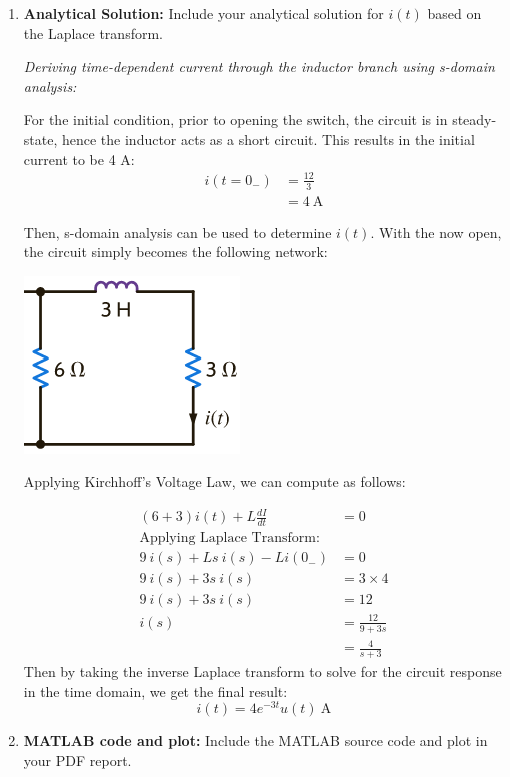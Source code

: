 \documentclass[10pt, letterpaper]{article}
\begin{document}
\begin{enumerate}
\item \textbf{Analytical Solution: }Include your analytical solution for $i(t)$ based on the Laplace transform.

\textit{Deriving time-dependent current through the inductor branch using s-domain analysis:} 

For the initial condition, prior to opening the switch, the circuit is in steady-state, hence the inductor acts as a short circuit. This results in the initial current to be 4 A:
\begin{align*}
    i(t = 0_-) &= \frac{12}{3} \\
               &= 4 \ \text{A}
\end{align*}

Then, s-domain analysis can be used to determine $i(t)$. With the now open, the circuit simply becomes the following network:
\begin{center}
    \includegraphics[width=0.2 \textwidth]{images/OC1.png}
\end{center}

Applying Kirchhoff's Voltage Law, we can compute as follows:

\begin{align*}
    (6+3) i(t) + L \frac{dI}{dt} &= 0 \\
    \text{Applying Laplace Transform: } \\
    9\ i(s) + Ls\ i(s) - Li(0_-) &= 0 \\ 
    9\ i(s) + 3s\ i(s)            &= 3\times 4 \\
    9\ i(s) + 3s\ i(s)            &= 12 \\
    i(s) &= \frac{12}{9+3s} \\
        &= \frac{4}{s+3}
\end{align*}
Then by taking the inverse Laplace transform to solve for the circuit response in the time domain, we get the final result: \\
$$ i(t) = 4 e^{-3t} u(t) \ \text{A}$$ 

\item \textbf{MATLAB code and plot: }Include the MATLAB source code and plot in your PDF report.


\end{enumerate}
\end{document}
